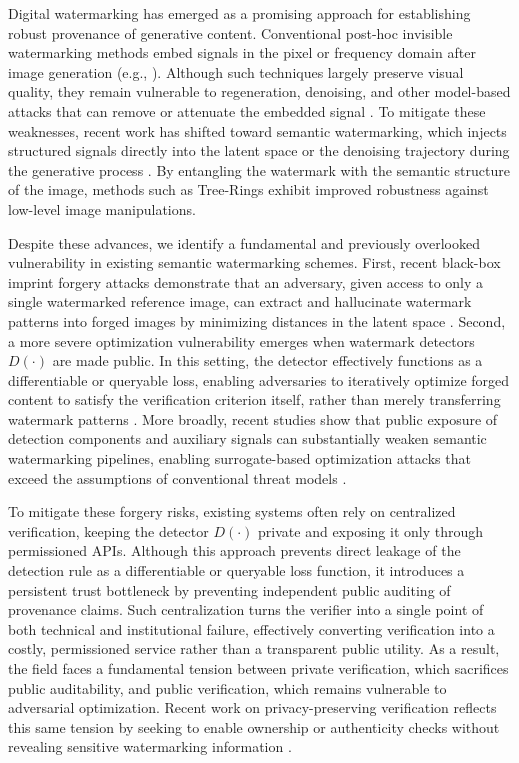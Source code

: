 \documentclass{article}
\theoremstyle{plain}
\theoremstyle{definition}
\theoremstyle{remark}
\begin{document}
Digital watermarking has emerged as a promising approach for establishing robust provenance of generative content. Conventional post-hoc invisible watermarking methods embed signals in the pixel or frequency domain after image generation (e.g., \cite{zhu2018hidden}). Although such techniques largely preserve visual quality, they remain vulnerable to regeneration, denoising, and other model-based attacks that can remove or attenuate the embedded signal \cite{zhao2024removable}. To mitigate these weaknesses, recent work has shifted toward semantic watermarking, which injects structured signals directly into the latent space or the denoising trajectory during the generative process \cite{wen2023treerings,fernandez2023stablesignature,zhang2024zodiac}. By entangling the watermark with the semantic structure of the image, methods such as Tree-Rings \cite{wen2023treerings} exhibit improved robustness against low-level image manipulations.

Despite these advances, we identify a fundamental and previously overlooked vulnerability in existing semantic watermarking schemes. First, recent black-box imprint forgery attacks demonstrate that an adversary, given access to only a single watermarked reference image, can extract and hallucinate watermark patterns into forged images by minimizing distances in the latent space \cite{muller2025blackbox}. Second, a more severe optimization vulnerability emerges when watermark detectors $D(\cdot)$ are made public. In this setting, the detector effectively functions as a differentiable or queryable loss, enabling adversaries to iteratively optimize forged content to satisfy the verification criterion itself, rather than merely transferring watermark patterns \cite{jiang2023evading}. More broadly, recent studies show that public exposure of detection components and auxiliary signals can substantially weaken semantic watermarking pipelines, enabling surrogate-based optimization attacks that exceed the assumptions of conventional threat models \cite{lin2025crack}.

To mitigate these forgery risks, existing systems often rely on centralized verification, keeping the detector $D(\cdot)$ private and exposing it only through permissioned APIs. Although this approach prevents direct leakage of the detection rule as a differentiable or queryable loss function, it introduces a persistent trust bottleneck by preventing independent public auditing of provenance claims. Such centralization turns the verifier into a single point of both technical and institutional failure, effectively converting verification into a costly, permissioned service rather than a transparent public utility. As a result, the field faces a fundamental tension between private verification, which sacrifices public auditability, and public verification, which remains vulnerable to adversarial optimization. Recent work on privacy-preserving verification reflects this same tension by seeking to enable ownership or authenticity checks without revealing sensitive watermarking information \cite{guo2024zeromark}.
\end{document}

